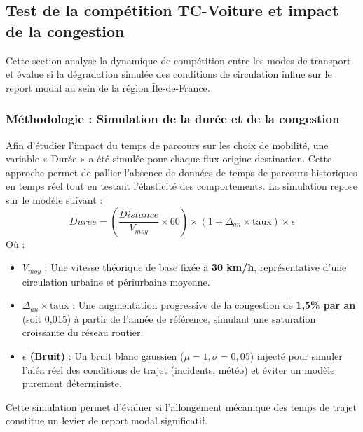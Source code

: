 \documentclass[11pt,a4paper]{article}
\begin{document}
\subsection{Test de la compétition TC-Voiture et impact de la congestion}
Cette section analyse la dynamique de compétition entre les modes de transport et évalue si la dégradation simulée des conditions de circulation influe sur le report modal au sein de la région Île-de-France.
\subsubsection{Méthodologie : Simulation de la durée et de la congestion}
Afin d'étudier l'impact du temps de parcours sur les choix de mobilité, une variable « Durée » a été simulée pour chaque flux origine-destination. Cette approche permet de pallier l'absence de données de temps de parcours historiques en temps réel tout en testant l'élasticité des comportements. La simulation repose sur le modèle suivant :
\begin{equation}
    Duree = \left( \frac{Distance}{V_{moy}} \times 60 \right) \times (1 + \Delta_{an} \times \text{taux}) \times \epsilon
\end{equation}
Où :
\begin{itemize}[label=\textbullet]
    \item \textbf{$V_{moy}$} : Une vitesse théorique de base fixée à \textbf{30 km/h}, représentative d'une circulation urbaine et périurbaine moyenne.
    \item \textbf{$\Delta_{an} \times \text{taux}$} : Une augmentation progressive de la congestion de \textbf{1,5\% par an} (soit 0,015) à partir de l'année de référence, simulant une saturation croissante du réseau routier.
    \item \textbf{$\epsilon$ (Bruit)} : Un bruit blanc gaussien ($\mu=1, \sigma=0,05$) injecté pour simuler l'aléa réel des conditions de trajet (incidents, météo) et éviter un modèle purement déterministe.
\end{itemize}
Cette simulation permet d'évaluer si l'allongement mécanique des temps de trajet constitue un levier de report modal significatif.
\end{document}
